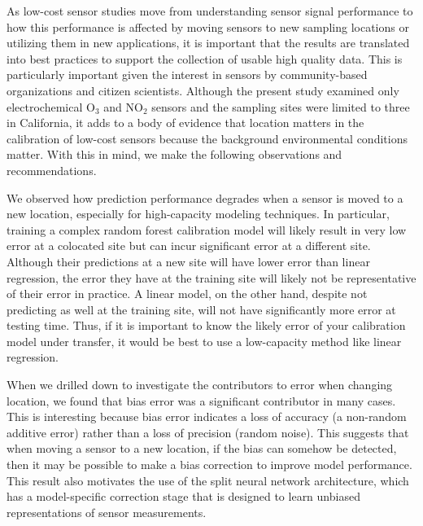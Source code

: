 \documentclass[journal abbreviation, manuscript]{copernicus}
\newcommand{\textus}[1]{$_{\text{#1}}$}
\begin{document}
As low-cost sensor studies move from understanding sensor signal performance to how this performance is affected by moving sensors to new sampling locations or utilizing them in new applications, it is important that the results are translated into best practices to support the collection of usable high quality data. This is particularly important given the interest in sensors by community-based organizations and citizen scientists. Although the present study examined only electrochemical O\textus{3} and NO\textus{2} sensors and the sampling sites were limited to three in California, it adds to a body of evidence that location matters in the calibration of low-cost sensors because the background environmental conditions matter.  With this in mind, we make the following observations and recommendations.

We observed how prediction performance degrades when a sensor is moved to a new location, especially for high-capacity modeling techniques. In particular, training a complex random forest calibration model will likely result in very low error at a colocated site but can incur significant error at a different site. Although their predictions at a new site will have lower error than linear regression, the error they have at the training site will likely not be representative of their error in practice.  A linear model, on the other hand, despite not predicting as well at the training site, will not have significantly more error at testing time.  Thus, if it is important to know the likely error of your calibration model under transfer, it would be best to use a low-capacity method like linear regression.

When we drilled down to investigate the contributors to error when changing location, we found that bias error was a significant contributor in many cases. This is interesting because bias error indicates a loss of accuracy (a non-random additive error) rather than a loss of precision (random noise). This suggests that when moving a sensor to a new location, if the bias can somehow be detected, then it may be possible to make a bias correction to improve model performance. This result also motivates the use of the split neural network architecture, which has a model-specific correction stage that is designed to learn unbiased representations of sensor measurements.
\end{document}
